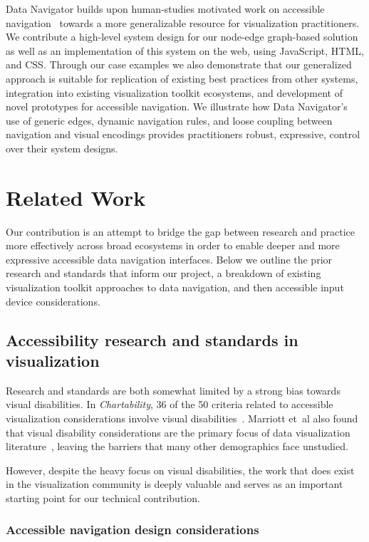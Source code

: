 \documentclass[journal]{vgtc}                %
\newcommand{\ea}{{et~al\xperiod}\xspace}
\begin{document}
Data Navigator builds upon human-studies motivated work on accessible navigation~\cite{Zong2022Rich,Thompson2023Chart} towards a more generalizable resource for visualization practitioners. We contribute a high-level system design for our node-edge graph-based solution as well as an implementation of this system on the web, using JavaScript, HTML, and CSS. Through our case examples we also demonstrate that our generalized approach is suitable for replication of existing best practices from other systems, integration into existing visualization toolkit ecosystems, and development of novel prototypes for accessible navigation. We illustrate how Data Navigator's use of generic edges, dynamic navigation rules, and loose coupling between navigation and visual encodings provides practitioners robust, expressive, control over their system designs.

\section{Related Work}
Our contribution is an attempt to bridge the gap between research and practice more effectively across broad ecosystems in order to enable deeper and more expressive accessible data navigation interfaces. Below we outline the prior research and standards that inform our project, a breakdown of existing visualization toolkit approaches to data navigation, and then accessible input device considerations.

\subsection{Accessibility research and standards in visualization}
Research and standards are both somewhat limited by a strong bias towards visual disabilities. In \textit{Chartability}, 36 of the 50 criteria related to accessible visualization considerations involve visual disabilities~\cite{Elavsky2022Chartability, Fan2023Accessibility}. Marriott \ea also found that visual disability considerations are the primary focus of data visualization literature~\cite{Marriott2021Inclusive}, leaving the barriers that many other demographics face unstudied.

However, despite the heavy focus on visual disabilities, the work that does exist in the visualization community is deeply valuable and serves as an important starting point for our technical contribution.

\subsubsection{Accessible navigation design considerations}
\end{document}

